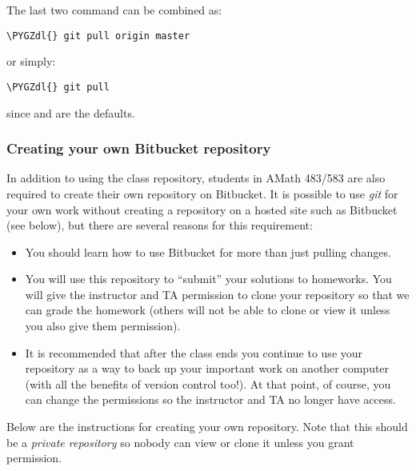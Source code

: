 \documentclass[letterpaper,10pt,english]{sphinxmanual}
\def\PYGZdl{\char`\$}
\begin{document}
The last two command can be combined as:

\begin{Verbatim}[commandchars=\\\{\}]
\PYGZdl{} git pull origin master
\end{Verbatim}

or simply:

\begin{Verbatim}[commandchars=\\\{\}]
\PYGZdl{} git pull
\end{Verbatim}

since  and  are the defaults.


\subsubsection{Creating your own Bitbucket repository}
\label{2013/git:mygit}\label{2013/git:creating-your-own-bitbucket-repository}
In addition to using the class repository, students in AMath 483/583 are
also required to create their own repository on Bitbucket.  It is possible
to use \emph{git} for your own work without creating a repository on a hosted
site such as Bitbucket (see  below), but there are several
reasons for this requirement:
\begin{itemize}
\item {} 
You should learn how to use Bitbucket for more than just pulling changes.

\item {} 
You will use this repository to ``submit'' your solutions to homeworks.
You will give the instructor and TA permission to clone your repository so
that we can grade the homework (others will not be able to clone or view it
unless you also give them permission).

\item {} 
It is recommended that after the class ends you
continue to use your repository as a way to back up your important work on
another computer (with all the benefits of version control too!).
At that point, of course, you can change the permissions so the
instructor and TA no longer have access.

\end{itemize}

Below are the instructions for creating your own repository.  Note that
this should be a \emph{private repository} so nobody can view or clone it unless
you grant permission.
\end{document}

